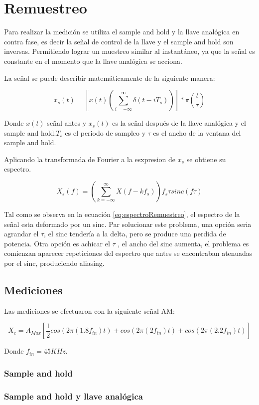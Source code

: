 \documentclass[../../ASSD_TP1_G7.tex]{subfiles}
\begin{document}
\chapter*{Remuestreo}
Para realizar la medición se utiliza el sample and hold y la llave analógica en contra fase, es decir la se\~nal de control de la llave y el sample and hold son inversas. Permitiendo lograr un muestreo similar al instantáneo, ya que la se\~nal es constante en el momento que la llave analógica se acciona.

La se\~nal se puede describir matemáticamente de la siguiente manera:

\begin{equation}
x_{s}(t)=\left[ x(t)\left( \sum_{i=-\infty}^{\infty} \delta(t - i T_s) \right) \right]* \pi(\frac{t}{\tau})
\end{equation}

\par Donde $x(t)$ se\~nal antes y $x_{s}(t)$ es la se\~nal después de la llave analógica y el sample and hold.$T_s$ es el periodo de sampleo y $\tau$ es el ancho de la ventana del sample and hold.
\par Aplicando la transformada de Fourier a la esxpresion de $x_{s}$ se obtiene su espectro.

\begin{equation}
X_{s}(f)=\left( \sum_{k=-\infty}^{\infty} X(f - k f _s) \right) f _s \tau sinc(f \tau) \label{eq:espectroRemuestreo}
\end{equation}

Tal como se observa en la ecuación \ref{eq:espectroRemuestreo}, el espectro de la se\~nal esta deformado por un sinc. Par solucionar este problema, una opción seria agrandar el $\tau$, el sinc tendería a la delta, pero se produce una perdida de potencia. Otra opción es achicar el $\tau$ , el ancho del sinc aumenta, el problema es comienzan aparecer repeticiones del espectro que antes se encontraban atenuadas por el sinc, produciendo aliasing.



\section*{Mediciones}

Las mediciones se efectuaron con la siguiente se\~nal AM:

\begin{equation}
X_c=A_{Max}[\frac{1}{2}cos(2\pi (1.8 f_{in})t)+cos(2\pi (2 f_{in})t)+cos(2\pi (2.2 f_{in})t)]
\end{equation}\label{eq:inputSignlanAM}

Donde $f_{in}=45KHz$.

\subsection*{Sample and hold}

\subsection*{Sample and hold y llave analógica}
\end{document}

